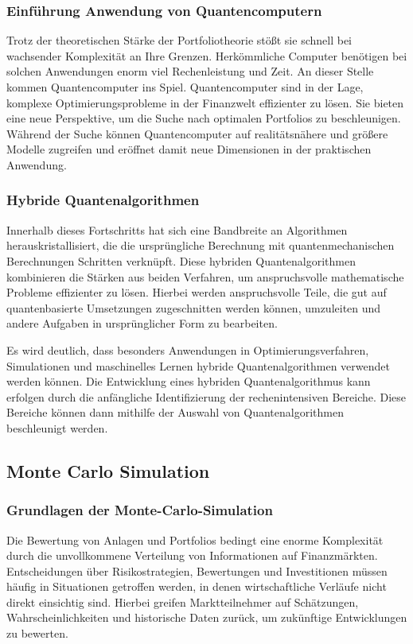 \subsubsection*{Einführung Anwendung von Quantencomputern}

Trotz der theoretischen Stärke der Portfoliotheorie stößt sie schnell bei wachsender Komplexität an Ihre Grenzen. Herkömmliche Computer benötigen bei solchen Anwendungen enorm viel Rechenleistung und Zeit. 
An dieser Stelle kommen Quantencomputer ins Spiel. Quantencomputer sind in der Lage, komplexe Optimierungsprobleme in der Finanzwelt effizienter zu lösen. Sie bieten eine neue Perspektive, um die Suche nach optimalen Portfolios zu beschleunigen. Während der Suche können Quantencomputer auf realitätsnähere und größere Modelle zugreifen und eröffnet damit neue Dimensionen in der praktischen Anwendung. 

\subsubsection*{Hybride Quantenalgorithmen}

Innerhalb dieses Fortschritts hat sich eine Bandbreite an Algorithmen herauskristallisiert, die die ursprüngliche Berechnung mit quantenmechanischen Berechnungen Schritten verknüpft. Diese hybriden Quantenalgorithmen kombinieren die Stärken aus beiden Verfahren, um anspruchsvolle mathematische Probleme effizienter zu lösen. Hierbei werden anspruchsvolle Teile, die gut auf quantenbasierte Umsetzungen zugeschnitten werden können, umzuleiten und andere Aufgaben in ursprünglicher Form zu bearbeiten. 

 
Es wird deutlich, dass besonders Anwendungen in Optimierungsverfahren, Simulationen und maschinelles Lernen hybride Quantenalgorithmen verwendet werden können. 
Die Entwicklung eines hybriden Quantenalgorithmus kann erfolgen durch die anfängliche Identifizierung der rechenintensiven Bereiche. Diese Bereiche können dann mithilfe der Auswahl von Quantenalgorithmen beschleunigt werden.

\subsection{ Monte Carlo Simulation}

\subsubsection*{Grundlagen der Monte-Carlo-Simulation}
Die Bewertung von Anlagen und Portfolios bedingt eine enorme Komplexität durch die unvollkommene Verteilung von Informationen auf Finanzmärkten. Entscheidungen über Risikostrategien, Bewertungen und Investitionen müssen häufig in Situationen getroffen werden, in denen wirtschaftliche Verläufe nicht direkt einsichtig sind. Hierbei greifen Marktteilnehmer auf Schätzungen, Wahrscheinlichkeiten und historische Daten zurück, um zukünftige Entwicklungen zu bewerten. 
 
